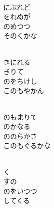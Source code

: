 \documentclass[10pt,b5j]{tarticle} %
\begin{document}
\begin{enumerate}
\begin{minipage}[c]{\blocksize}
        \vspace{\linespace}
        \item~\\
        にぶれど\\
        をれぬが\\
        のめつつ\\
        そのくかな
        
    \end{minipage}
    \begin{minipage}[c]{\blocksize}
        
        \vspace{\linespace}
        \item~\\
        きにれる\\
        きりて\\
        のをちけし\\
        このもやかん
        
    \end{minipage}
    \begin{minipage}[c]{\blocksize}
        
        \vspace{\linespace}
        \item~\\
        のもまりて\\
        のかなる\\
        ののらかさ\\
        このもぐるかな
        
    \end{minipage}
    \begin{minipage}[c]{\blocksize}
        
        \vspace{\linespace}
        \item~\\
        く\\
        すの\\
        のをいつつ\\
        してくる
        

\end{minipage}
\end{enumerate}
\end{document}

